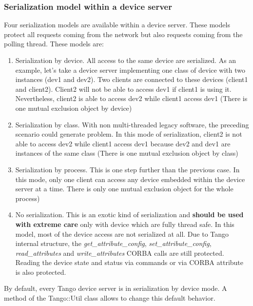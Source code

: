 \subsubsection{Serialization model within a device server\label{sub:Serialization-model-within}}

Four serialization models are available within
a device server. These models protect all requests coming from the
network but also requests coming from the polling thread. These models
are:
\begin{enumerate}
\item Serialization by device. All access to the same device are serialized.
As an example, let's take a device server implementing one class of
device with two instances (dev1 and dev2). Two clients are connected
to these devices (client1 and client2). Client2 will not be able to
access dev1 if client1 is using it. Nevertheless, client2 is able
to access dev2 while client1 access dev1 (There is one mutual exclusion
object by device)
\item Serialization by class. With non multi-threaded legacy software, the
preceding scenario could generate problem. In this mode of serialization,
client2 is not able to access dev2 while client1 access dev1 because
dev2 and dev1 are instances of the same class (There is one mutual
exclusion object by class)
\item Serialization by process. This is one step further than the previous
case. In this mode, only one client can access any device embedded
within the device server at a time. There is only one mutual exclusion
object for the whole process)
\item No serialization. This is an exotic kind of serialization and \textbf{should
be used with extreme care} only with device which are fully thread
safe. In this model, most of the device access are not serialized
at all. Due to Tango internal structure, the \emph{get\_attribute\_config},
\emph{set\_attribute\_config}, \emph{read\_attributes} and \emph{write\_attributes}
CORBA calls are still protected. Reading the device state and status
via commands or via CORBA attribute is also protected.
\end{enumerate}
By default, every Tango device server is in serialization by device
mode. A method of the Tango::Util class allows to change this default
behavior.\newpage{}

